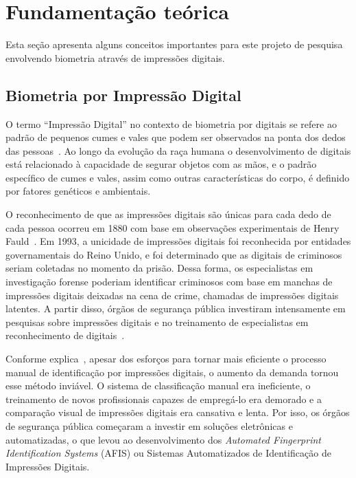 \section{Fundamentação teórica}\label{sec:fundamentacao_teorica}

Esta seção apresenta alguns conceitos importantes para este projeto de pesquisa envolvendo biometria através de impressões digitais.

\subsection{Biometria por Impressão Digital}\label{subsec:impressoes_digitais}

O termo ``Impressão Digital'' no contexto de biometria por digitais se refere ao padrão de pequenos cumes e vales que podem ser observados na ponta dos dedos das pessoas~\cite{HandbookOfBiometrics}. Ao longo da evolução da raça humana o desenvolvimento de digitais está relacionado à capacidade de segurar objetos com as mãos, e o padrão específico de cumes e vales, assim como outras características do corpo, é definido por fatores genéticos e ambientais.

O reconhecimento de que as impressões digitais são únicas para cada dedo de cada pessoa ocorreu em 1880 com base em observações experimentais de Henry Fauld~\cite{FingerPrintTechniques}. Em 1993, a unicidade de impressões digitais foi reconhecida por entidades governamentais do Reino Unido, e foi determinado que as digitais de criminosos seriam coletadas no momento da prisão. Dessa forma, os especialistas em investigação forense poderiam identificar criminosos com base em manchas de impressões digitais deixadas na cena de crime, chamadas de impressões digitais latentes. A partir disso, órgãos de segurança pública investiram intensamente em pesquisas sobre impressões digitais e no treinamento de especialistas em reconhecimento de digitais~\cite{FingerPrintMechanics}.

Conforme explica~, apesar dos esforços para tornar mais eficiente o processo manual de identificação por impressões digitais, o aumento da demanda tornou esse método inviável. O sistema de classificação manual era ineficiente, o treinamento de novos profissionais capazes de empregá-lo era demorado e a comparação visual de impressões digitais era cansativa e lenta. Por isso, os órgãos de segurança pública começaram a investir em soluções eletrônicas e automatizadas, o que levou ao desenvolvimento dos \textit{Automated Fingerprint
Identification Systems} (AFIS) ou Sistemas Automatizados de Identificação de Impressões Digitais. 

